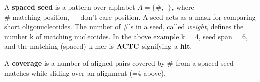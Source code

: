 \documentclass[portrait,final,a0paper,fontscale=0.277]{baposter}
\begin{document}
\begin{poster}
{  A {\bf spaced seed} is a pattern over alphabet 
  $A=\{\textbf{\#}, \textbf{--}\}$, where\\
  $\#$ matching position,\, $-$ don't care position.
\vspace{-0.5em}  
\vspace{-0.8em}
A seed acts as a mask for comparing short oligonucleotides.
The number of $\textbf{\#}$'s in a seed, called {\em weight},
defines the number k of matching nucleotides. 
In the above example k = 4, seed span = 6,
and the matching (spaced) k-mer is ${\bf ACTC}$ signifying a {\bf hit}.

A {\bf coverage} is a number of aligned pairs covered 
by $\textbf{\#}$ from a spaced seed matches while sliding over an alignment 
(=4 above).
   \vspace{0.3em}
  }


\end{poster}
\end{document}
